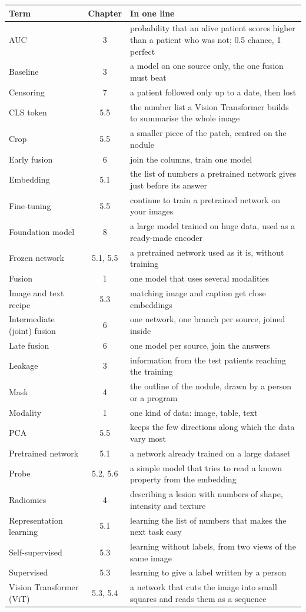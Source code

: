 \documentclass[11pt,a4paper]{article}
\begin{document}
\begin{center}
\small
\begin{tabular}{@{}lcp{9.2cm}@{}}
\toprule
Term & Chapter & In one line \\
\midrule
AUC & 3 & probability that an alive patient scores higher than a patient who was not; 0.5 chance, 1 perfect \\
Baseline & 3 & a model on one source only, the one fusion must beat \\
Censoring & 7 & a patient followed only up to a date, then lost \\
CLS token & 5.5 & the number list a Vision Transformer builds to summarise the whole image \\
Crop & 5.5 & a smaller piece of the patch, centred on the nodule \\
Early fusion & 6 & join the columns, train one model \\
Embedding & 5.1 & the list of numbers a pretrained network gives just before its answer \\
Fine-tuning & 5.5 & continue to train a pretrained network on your images \\
Foundation model & 8 & a large model trained on huge data, used as a ready-made encoder \\
Frozen network & 5.1, 5.5 & a pretrained network used as it is, without training \\
Fusion & 1 & one model that uses several modalities \\
Image and text recipe & 5.3 & matching image and caption get close embeddings \\
Intermediate (joint) fusion & 6 & one network, one branch per source, joined inside \\
Late fusion & 6 & one model per source, join the answers \\
Leakage & 3 & information from the test patients reaching the training \\
Mask & 4 & the outline of the nodule, drawn by a person or a program \\
Modality & 1 & one kind of data: image, table, text \\
PCA & 5.5 & keeps the few directions along which the data vary most \\
Pretrained network & 5.1 & a network already trained on a large dataset \\
Probe & 5.2, 5.6 & a simple model that tries to read a known property from the embedding \\
Radiomics & 4 & describing a lesion with numbers of shape, intensity and texture \\
Representation learning & 5.1 & learning the list of numbers that makes the next task easy \\
Self-supervised & 5.3 & learning without labels, from two views of the same image \\
Supervised & 5.3 & learning to give a label written by a person \\
Vision Transformer (ViT) & 5.3, 5.4 & a network that cuts the image into small squares and reads them as a sequence \\
\bottomrule
\end{tabular}
\end{center}
\end{document}
